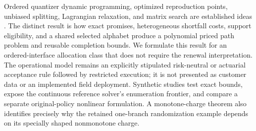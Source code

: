 Ordered quantizer dynamic programming, optimized reproduction points, unbiased splitting, Lagrangian relaxation, and matrix search are established ideas \citep{Wu1991,PagesWilbertz2012,CrociEtAl2022,JourdainPages2021,HandlerZang1980,Lemarechal2001}. The distinct result is how exact promises, heterogeneous shortfall costs, support eligibility, and a shared selected alphabet produce a polynomial priced path problem and reusable completion bounds. We formulate this result for an ordered-interface allocation class that does not require the renewal interpretation. The operational model remains an explicitly stipulated risk-neutral or actuarial acceptance rule followed by restricted execution; it is not presented as customer data or an implemented field deployment. Synthetic studies test exact bounds, expose the continuous reference solver's enumeration frontier, and compare a separate original-policy nonlinear formulation. A monotone-charge theorem also identifies precisely why the retained one-branch randomization example depends on its specially shaped nonmonotone charge.
